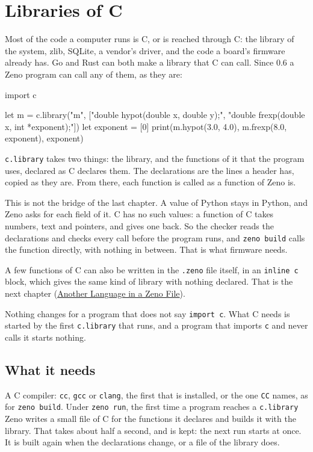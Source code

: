 \chapter{Libraries of C}\label{ch-c-libraries}

Most of the code a computer runs is C, or is reached through C: the
library of the system, zlib, SQLite, a vendor's driver, and the code a
board's firmware already has. Go and Rust can both make a library
that C can call. Since 0.6 a Zeno program can call any of them, as
they are:

\begin{zeno}[file=maths.zeno, dir=maths]
import c

let m = c.library("m", ["double hypot(double x, double y);", "double frexp(double x, int *exponent);"])
let exponent = [0]
print(m.hypot(3.0, 4.0), m.frexp(8.0, exponent), exponent)
\end{zeno}

\verb|c.library| takes two things: the library, and the functions of
it that the program uses, declared as C declares them. The
declarations are the lines a header has, copied as they are. From
there, each function is called as a function of Zeno is.

This is not the bridge of the last chapter. A value of Python stays
in Python, and Zeno asks for each field of it. C has no such values:
a function of C takes numbers, text and pointers, and gives one back.
So the checker reads the declarations and checks every call before the
program runs, and \verb|zeno build| calls the function directly, with
nothing in between. That is what firmware needs.

A few functions of C can also be written in the \verb|.zeno| file
itself, in an \verb|inline c| block, which gives the same kind of
library with nothing declared. That is the next chapter
(\hyperref[ch-inline]{Another Language in a Zeno File}).

\begin{note}
Nothing changes for a program that does not say \verb|import c|. What
C needs is started by the first \verb|c.library| that runs, and a
program that imports \verb|c| and never calls it starts nothing.
\end{note}

\section{What it needs}

A C compiler: \verb|cc|, \verb|gcc| or \verb|clang|, the first that is
installed, or the one \verb|CC| names, as for \verb|zeno build|. Under
\verb|zeno run|, the first time a program reaches a \verb|c.library|
Zeno writes a small file of C for the functions it declares and builds
it with the library. That takes about half a second, and is kept: the
next run starts at once. It is built again when the declarations
change, or a file of the library does.

